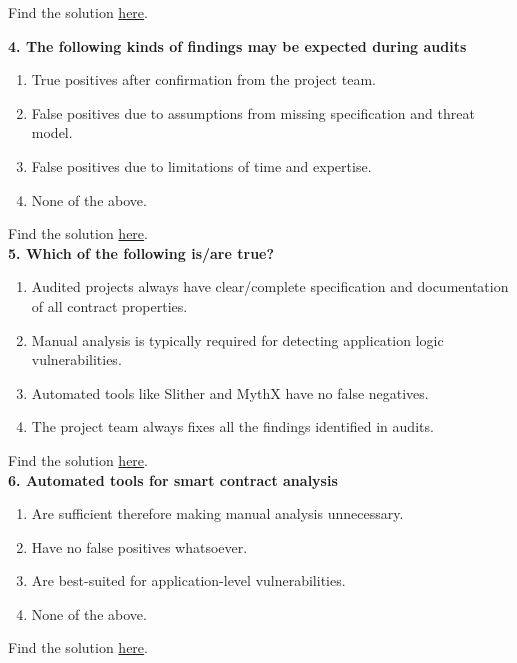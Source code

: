 Find the solution \hyperref[sec:exam6_q3]{here}.\\

\pagebreak

\textbf{4. The following kinds of findings may be expected during audits}

\begin{enumerate}[label=\Alph*.]
    \item True positives after confirmation from the project team.
    \item False positives due to assumptions from missing specification and threat model.
    \item False positives due to limitations of time and expertise.
    \item None of the above.
\end{enumerate}

Find the solution \hyperref[sec:exam6_q4]{here}.\\

\textbf{5. Which of the following is/are true?}

\begin{enumerate}[label=\Alph*.]
    \item Audited projects always have clear/complete specification and documentation of all contract properties.
    \item Manual analysis is typically required for detecting application logic vulnerabilities.
    \item Automated tools like Slither and MythX have no false negatives.
    \item The project team always fixes all the findings identified in audits.
\end{enumerate}

Find the solution \hyperref[sec:exam6_q5]{here}.\\

\textbf{6. Automated tools for smart contract analysis}

\begin{enumerate}[label=\Alph*.]
    \item Are sufficient therefore making manual analysis unnecessary.
    \item Have no false positives whatsoever.
    \item Are best-suited for application-level vulnerabilities.
    \item None of the above.
\end{enumerate}

Find the solution \hyperref[sec:exam6_q6]{here}.\\

